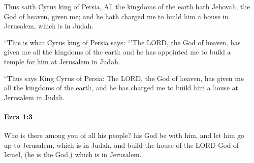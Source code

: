 			\begin{versebox}
					\item[BHS] 
					\item[LXX] 
					\item[ASV] Thus saith Cyrus king of Persia, All the kingdoms of the earth hath Jehovah, the God of heaven, given me; and he hath charged me to build him a house in Jerusalem, which is in Judah.
					\item[NIV] “This is what Cyrus king of Persia says: “’The LORD, the God of heaven, has given me all the kingdoms of the earth and he has appointed me to build a temple for him at Jerusalem in Judah.
					\item[NRSV] “Thus says King Cyrus of Persia: The LORD, the God of heaven, has given me all the kingdoms of the earth, and he has charged me to build him a house at Jerusalem in Judah.
			\end{versebox}

		\paragraph{Ezra 1:3} %
			\label{EZRA-1-3}

			Who is there among you of all his people? his God be with him, and let him go up to Jerusalem, which is in Judah, and build the house of the LORD God of Israel, (he is the God,) which is in Jerusalem.


